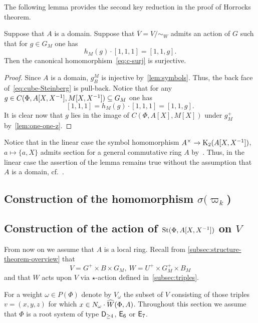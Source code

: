 The following lemma provides the second key reduction in the proof of Horrocks theorem.
\begin{lemma} \label{lem:second-reduction}
    Suppose that $A$ is a domain.
    Suppose that $\overline{V} = V/\sim_W$ admits an action of $G$ such that
      for $g \in G_M$ one has \[ h_M(g) \cdot [1, 1, 1] = [1, 1, g]. \]
    Then the canonical homomorphism~\eqref{eq:c-surj} is surjective.
\end{lemma}
\begin{proof}
  Since $A$ is a domain, $g^M_B$ is injective by~\cref{lem:symbols}.
    Thus, the back face of~\eqref{eq:cube-Steinberg} is pull-back.
  Notice that for any $g \in C(\Phi, A[X, X^{-1}], M[X, X^{-1}]) \subseteq G_M$ one has
    \[ [1, 1, 1] = h_M(g) \cdot [1, 1, 1] = [1, 1, g].\]
  It is clear now that $g$ lies in the image of $C(\Phi, A[X], M[X])$ under $g^+_M$ by~\cref{lem:one-one-z}.
\end{proof}

\begin{rem}
    Notice that in the linear case the symbol homomorphism $A^\times \to \operatorname{K}_2(A[X, X^{-1}])$, $a \mapsto \{a, X\}$ admits section
     for a general commutative ring $A$ by~\cite{Wa71}.
    Thus, in the linear case the assertion of the lemma remains true without the assumption that $A$ is a domain, cf.~\cite[Lemma~3.1g]{Tu83}.
\end{rem}

\subsection{Construction of the homomorphism $\sigma(\varpi_k$)} \label{subsec:construction-sigma}


\subsection{Construction of the action of $\operatorname{St}(\Phi, A[X, X^{-1}])$ on $V$} \label{sec:construction-delta}
From now on we assume that $A$ is a local ring.
Recall from \cref{subsec:structure-theorem-overview} that \[V = G^+ \times B \times G_M,\ W = U^+ \times G_M^+ \times B_M\]
and that $W$ acts upon $V$ via $\star$-action defined in~\cref{subsec:triples}.

For a weight $\omega \in P(\Phi)$ denote by $V_\omega$ the subset of $V$ consisting of those triples $v = (x, y, z)$ for which $x \in N_\omega\cdot \widehat{W}(\Phi, A)$.
Throughout this section we assume that $\Phi$ is a root system of type $\mathsf{D}_{\geq 4}$, $\mathsf{E}_6$ or $\mathsf{E}_7$.

